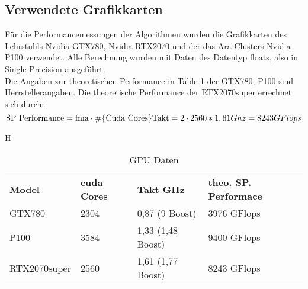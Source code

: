 \documentclass[10pt,a4paper]{article}
\begin{document}
	 \subsection{Verwendete Grafikkarten}
	 Für die Performancemessungen der Algorithmen wurden die Grafikkarten des Lehrstuhls Nvidia GTX780, Nvidia RTX2070 und der das Ara-Clusters Nvidia P100 verwendet. Alle Berechnung wurden mit Daten des Datentyp floats, also in Single Precision ausgeführt.\\
	 Die Angaben zur theoretischen Performance in Table \ref{GPU Daten} der GTX780, P100 sind Herrstellerangaben. Die theoretische Performance der RTX2070super errechnet sich durch: $$\text{SP Performance}= \text{fma}\cdot \# \{\text{Cuda Cores}\} \text{Takt}\\
	 =2\cdot 2560*1,61 Ghz\\
	 =8243 GFlops$$
	 \begin{table}{H}
	 	\centering
	 	\begin{tabular}{llll}
	 		\textbf{Model}  & \textbf{cuda Cores} & \textbf{Takt GHz}  & \textbf{theo. SP. Performace} &\\
	 		GTX780           & 2304       & 0,87 (9 Boost) & 3976 GFlops   \\
	 		P100       & 3584 & 1,33 (1,48 Boost) &9400     GFlops        \\
	 		RTX2070super        & 2560 & 1,61 (1,77 Boost) &   8243 GFlops         \\
	 	\end{tabular}
	 	
	 	\caption{GPU Daten}
	 	\label{GPU Daten}
	 	
	 \end{table}
\end{document}
